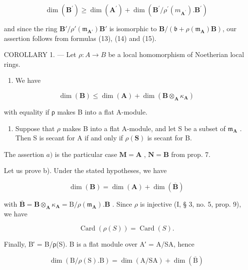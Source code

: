 \[
\dim (\mathbf {B} ^ {\prime}) \geqslant \dim (\mathbf {A} ^ {\prime}) + \dim (\mathbf {B} ^ {\prime} / \rho^ {\prime} (m _ {\mathbf {A} ^ {\prime}}). \mathbf {B} ^ {\prime})\tag{15}
\]

and since the ring \(\mathbf{B}'/\rho'(\mathfrak{m}_{\mathbf{A}'})\mathbf{B}'\) is isomorphic to \(\mathbf{B}/(\mathfrak{b} + \rho(\mathfrak{m}_{\mathbf{A}})\mathbf{B})\), our assertion follows from formulas (13), (14) and (15).

COROLLARY 1. --- Let \(\rho: A \to B\) be a local homomorphism of Noetherian local rings.

\begin{enumerate}
\def\labelenumi{\alph{enumi})}
\tightlist
\item
  We have
\end{enumerate}

\[
\dim (\mathbf {B}) \leqslant \dim (\mathbf {A}) + \dim (\mathbf {B} \otimes_ {\mathbf {A}} \kappa_ {\mathbf {A}})\tag{16}
\]

with equality if ρ makes B into a flat A-module.

\begin{enumerate}
\def\labelenumi{\alph{enumi})}
\setcounter{enumi}{1}
\tightlist
\item
  Suppose that \(\rho\) makes B into a flat A-module, and let S be a subset of \(\mathfrak{m}_{\mathbf{A}}\) . Then S is secant for A if and only if \(\rho(\mathbf{S})\) is secant for B.
\end{enumerate}

The assertion \(a)\) is the particular case \(\mathbf{M} = \mathbf{A}\) , \(\mathbf{N} = \mathbf{B}\) from prop. 7.

Let us prove b). Under the stated hypotheses, we have

\[
\dim (\mathbf {B}) = \dim (\mathbf {A}) + \dim (\overline {{\mathbf {B}}})\tag{17}
\]

with \(\overline{\mathbf{B}} = \mathbf{B} \otimes_{\mathbf{A}} \kappa_{\mathbf{A}} = \mathrm{B} / \rho(\mathfrak{m}_{\mathbf{A}}) . \mathbf{B}\) . Since \(\rho\) is injective (I, § 3, no. 5, prop. 9), we have

\[
\operatorname{Card} (\rho (S)) = \operatorname{Card} (S).\tag{18}
\]

Finally, B′ = B/ρ(S). B is a flat module over A′ = A/SA, hence

\[
\dim (\mathrm{B} / \rho (\mathrm{S}). \mathrm{B}) = \dim (\mathrm{A} / \mathrm{SA}) + \dim (\overline {{\mathrm{B}}})\tag{19}
\]

